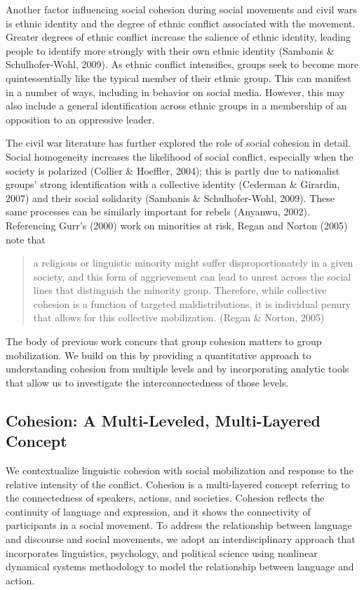 \documentclass[
  english,
  man]{apa6}
\begin{document}
Another factor influencing social cohesion during social movements and civil
wars is ethnic identity and the degree of ethnic conflict associated with the
movement. Greater degrees of ethnic conflict increase the salience of ethnic
identity, leading people to identify more strongly with their own ethnic
identity (Sambanis \& Schulhofer-Wohl, 2009). As ethnic conflict intensifies, groups seek to become
more quintessentially like the typical member of their ethnic group. This can
manifest in a number of ways, including in behavior on social media. However,
this may also include a general identification across ethnic groups in a
membership of an opposition to an oppressive leader.

The civil war literature has further explored the role of social cohesion in
detail. Social homogeneity increases the likelihood of social conflict,
especially when the society is polarized (Collier \& Hoeffler, 2004); this is partly
due to nationalist groups' strong identification with a collective identity
(Cederman \& Girardin, 2007) and their social solidarity (Sambanis \& Schulhofer-Wohl, 2009). These
same processes can be similarly important for rebels (Anyanwu, 2002).
Referencing Gurr's (2000) work on minorities at
risk, Regan and Norton (2005) note that

\begin{quote}
a religious or linguistic minority
might suffer disproportionately in a given society, and this form of
aggrievement can lead to unrest across the social lines that distinguish the
minority group. Therefore, while collective cohesion is a function of targeted
maldistributions, it is individual penury that allows for this collective
mobilization. (Regan \& Norton, 2005)
\end{quote}

The body of previous work concurs that group cohesion matters to group
mobilization. We build on this by providing a quantitative approach to
understanding cohesion from multiple levels and by incorporating analytic tools
that allow us to investigate the interconnectedness of those levels.

\hypertarget{cohesion-a-multi-leveled-multi-layered-concept}{%
\subsection{Cohesion: A Multi-Leveled, Multi-Layered Concept}\label{cohesion-a-multi-leveled-multi-layered-concept}}

We contextualize linguistic cohesion with social mobilization and response to
the relative intensity of the conflict. Cohesion is a multi-layered concept
referring to the connectedness of speakers, actions, and societies. Cohesion
reflects the continuity of language and expression, and it shows the
connectivity of participants in a social movement. To address the relationship
between language and discourse and social movements, we adopt an
interdisciplinary approach that incorporates linguistics, psychology, and
political science using nonlinear dynamical systems methodology to model the
relationship between language and action.
\end{document}

